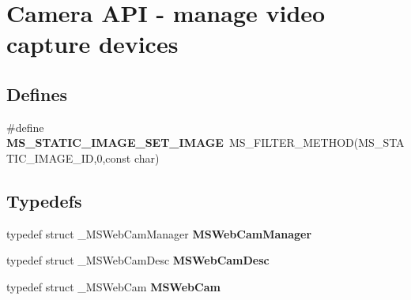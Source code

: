 \section{Camera API -\/ manage video capture devices}
\label{group__mediastreamer2__webcam}
\subsection*{Defines}
\begin{DoxyCompactItemize}
\item 
\#define {\bf MS\_\-STATIC\_\-IMAGE\_\-SET\_\-IMAGE}~MS\_\-FILTER\_\-METHOD(MS\_\-STATIC\_\-IMAGE\_\-ID,0,const char)
\end{DoxyCompactItemize}
\subsection*{Typedefs}
\begin{DoxyCompactItemize}
\item 
typedef struct \_\-MSWebCamManager {\bf MSWebCamManager}
\item 
typedef struct \_\-MSWebCamDesc {\bf MSWebCamDesc}
\item 
typedef struct \_\-MSWebCam {\bf MSWebCam}
\end{DoxyCompactItemize}
